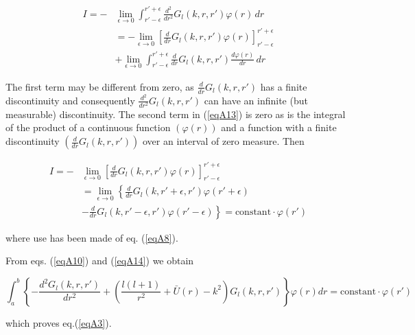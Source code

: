\documentclass[a4paper,14pt]{book}
\begin{document}
\begin{equation}\label{eqA13}
\begin{split}
I=-&\lim_{\epsilon \rightarrow 0} \int_{r'-\epsilon}^{r'+\epsilon}  \frac{d^2}{dr^2} G_l(k,r,r') \varphi(r) \,dr \\
&=-\lim_{\epsilon \rightarrow 0} \left[ \frac{d}{dr} G_l(k,r,r') \varphi(r) \right]^{r'+\epsilon}_{r'-\epsilon}\\
&+\lim_{\epsilon \rightarrow 0} \int_{r'-\epsilon}^{r'+\epsilon}  \frac{d}{dr} G_l(k,r,r') \frac{d\varphi(r)}{dr} \,dr
\end{split}
\end{equation}

The first term may be different from zero, as $\frac{d}{dr} G_l(k,r,r')$ has a finite discontinuity and consequently $\frac{d^2}{dr^2} G_l(k,r,r')$ can have an infinite (but measurable) discontinuity. The second term in (\ref{eqA13}) is zero as is the integral of the product of a continuous function $(\varphi(r))$ and a function with a finite discontinuity $(\frac{d}{dr} G_l(k,r,r'))$ over an interval of zero measure. Then

\begin{equation}\label{eqA14}
\begin{split}
I=-& \lim_{\epsilon \rightarrow 0} \left[ \frac{d}{dr} G_l(k,r,r') \varphi(r) \right]^{r'+\epsilon}_{r'-\epsilon}\\
&= \lim_{\epsilon \rightarrow 0} \left\{ \frac{d}{dr} G_l(k,r'+\epsilon,r') \varphi(r'+\epsilon) \right. \\
&- \left.\frac{d}{dr} G_l(k,r'-\epsilon,r') \varphi(r'-\epsilon)\right\rbrace = \text{constant}\cdot\varphi(r')
\end{split}
\end{equation}

where use has been made of eq. (\ref{eqA8}).


From eqs.  (\ref{eqA10}) and  (\ref{eqA14}) we obtain

\begin{equation*}
\int_a^b\left\lbrace -\frac{d^2G_l(k,r,r')}{dr^2}+\left( \frac{l(l+1)}{r^2}+\bar U(r)-k^2\right) G_l(k,r,r')\right\rbrace \varphi(r) dr = \text{constant}\cdot\varphi(r')
\end{equation*}

which proves eq.(\ref{eqA3}).
\end{document}

